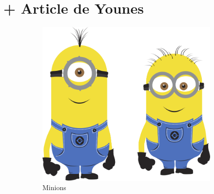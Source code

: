 \section{+ Article de Younes}



\begin{figure}[htb]
  \centering
  \begin{subfigure}[t]{0.49\linewidth}
    \includegraphics[width=\linewidth]{minion}
    \caption{Minions}
    \label{fig:minion}
  \end{subfigure}%
  \hfill
  \begin{subfigure}[t]{0.49\linewidth}

\end{subfigure}
\end{figure}
